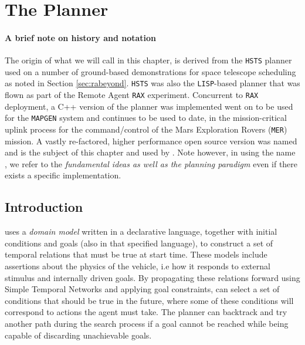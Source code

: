 \section{The \eu Planner }
\label{sec:basics}

\paragraph {A brief note on \eu history and notation} The origin of
what we will call \eu in this chapter, is derived from the
\texttt{HSTS} planner \cite{mus94} used on a number of ground-based
demonstrations for space telescope scheduling as noted in Section
\ref{sec:rabeyond}. \texttt{HSTS} was also the \texttt{LISP}-based
planner that was flown as part of the Remote Agent \texttt{RAX}
experiment. Concurrent to \texttt{RAX} deployment, a C++ version of
the planner was implemented  went on to
be used for the \texttt{MAPGEN} \cite{bresina05} system and continues
to be used to date, in the mission-critical uplink process for the
command/control of the Mars Exploration Rovers (\texttt{MER})
mission. A vastly re-factored, higher performance open source version
\cite{europapso} was named \eut and is the subject of this chapter and
used by \rxe.  Note however, in using the name \eu, we refer to the
\emph{fundamental ideas as well as the planning paradigm} even if
there exists a specific implementation.

\subsection{Introduction}
\label{sec:euintro}

\eu uses a \emph{domain model} 
written in a declarative language, together with initial conditions
and goals (also in that specified language), to construct a set of
temporal relations that must be true at start time. These models
include assertions about the physics of the vehicle, i.e how it
responds to external stimulus and internally driven goals. By
propagating these relations forward using Simple Temporal Networks
\cite{dechter91} and applying goal constraints, \eu can select a set
of conditions that should be true in the future, where some of these
conditions will correspond to actions the agent must take. The planner
can backtrack and try another path during the search process if a goal
cannot be reached while being capable of discarding unachievable
goals.

